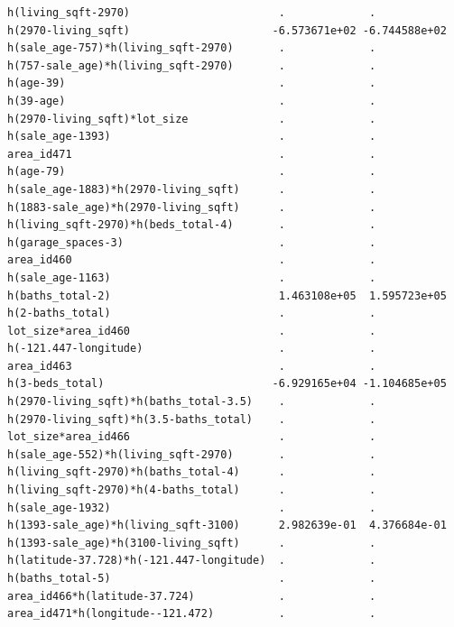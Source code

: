\documentclass[
]{article}
\begin{document}
\begin{verbatim}
h(living_sqft-2970)                       .             .           
h(2970-living_sqft)                      -6.573671e+02 -6.744588e+02
h(sale_age-757)*h(living_sqft-2970)       .             .           
h(757-sale_age)*h(living_sqft-2970)       .             .           
h(age-39)                                 .             .           
h(39-age)                                 .             .           
h(2970-living_sqft)*lot_size              .             .           
h(sale_age-1393)                          .             .           
area_id471                                .             .           
h(age-79)                                 .             .           
h(sale_age-1883)*h(2970-living_sqft)      .             .           
h(1883-sale_age)*h(2970-living_sqft)      .             .           
h(living_sqft-2970)*h(beds_total-4)       .             .           
h(garage_spaces-3)                        .             .           
area_id460                                .             .           
h(sale_age-1163)                          .             .           
h(baths_total-2)                          1.463108e+05  1.595723e+05
h(2-baths_total)                          .             .           
lot_size*area_id460                       .             .           
h(-121.447-longitude)                     .             .           
area_id463                                .             .           
h(3-beds_total)                          -6.929165e+04 -1.104685e+05
h(2970-living_sqft)*h(baths_total-3.5)    .             .           
h(2970-living_sqft)*h(3.5-baths_total)    .             .           
lot_size*area_id466                       .             .           
h(sale_age-552)*h(living_sqft-2970)       .             .           
h(living_sqft-2970)*h(baths_total-4)      .             .           
h(living_sqft-2970)*h(4-baths_total)      .             .           
h(sale_age-1932)                          .             .           
h(1393-sale_age)*h(living_sqft-3100)      2.982639e-01  4.376684e-01
h(1393-sale_age)*h(3100-living_sqft)      .             .           
h(latitude-37.728)*h(-121.447-longitude)  .             .           
h(baths_total-5)                          .             .           
area_id466*h(latitude-37.724)             .             .           
area_id471*h(longitude--121.472)          .             .           
                                                                    

\end{verbatim}
\end{document}
